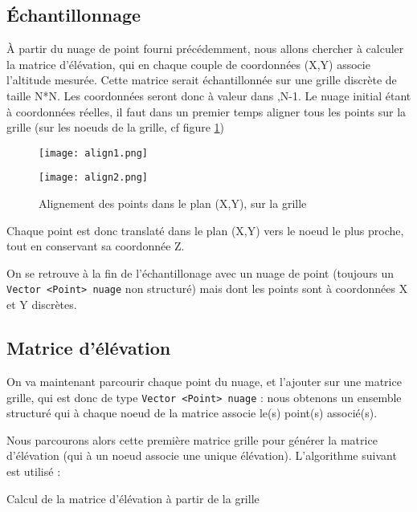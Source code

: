 \subsection{Échantillonnage}
À partir du nuage de point fourni précédemment, nous allons chercher à calculer la matrice d'élévation, qui en chaque couple de coordonnées (X,Y) associe l'altitude mesurée. Cette matrice serait échantillonnée sur une grille discrète de taille N*N. Les coordonnées seront donc à valeur dans ,N-1\textrbrackdbl.
Le nuage initial étant à coordonnées réelles, il faut dans un premier temps aligner tous les points sur la grille (sur les noeuds de la grille, cf figure \ref{align})
\begin{figure}[H]
  \centering
    \begin{minipage}{.4\linewidth}%
      \texttt{[image: align1.png]}
    \end{minipage}%
    \begin{minipage}{.2\linewidth}%
    \end{minipage}%
    \begin{minipage}{.4\linewidth}%
      \texttt{[image: align2.png]}
    \end{minipage}%
   \label{align}
   \caption{Alignement des points dans le plan (X,Y), sur la grille}
\end{figure}

Chaque point est donc translaté dans le plan (X,Y) vers le noeud le plus proche, tout en conservant sa coordonnée Z.

On se retrouve à la fin de l'échantillonage avec un nuage de point (toujours un \texttt{Vector <Point> nuage} non structuré) mais dont les points sont à coordonnées X et Y discrètes. 

\subsection{Matrice d'élévation}
On va maintenant parcourir chaque point du nuage, et l'ajouter sur une matrice grille, qui est donc de type \texttt{Vector <Point> nuage} : nous obtenons un ensemble structuré qui à chaque noeud de la matrice associe le(s) point(s) associé(s).

Nous parcourons alors cette première matrice grille pour générer la matrice d'élévation (qui à un noeud associe une unique élévation). L'algorithme suivant est utilisé :

\begin{algorithm}[H]
 \caption{Calcul de la matrice d'élévation à partir de la grille}
\end{algorithm}

